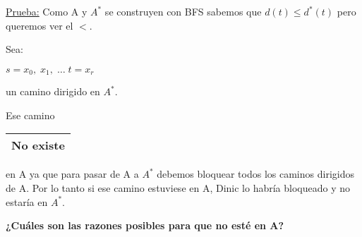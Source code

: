 \documentclass[12pt,a4paper]{report}
\begin{document}
		\underline{Prueba:} Como A y $A^{*}$ se construyen con BFS sabemos que $d(t) \leq d^{*}(t)$ pero queremos ver el $<$.

		Sea:
		\begin{center}
			$s = x_{0}, \; x_{1}, \; \dotsc \; t = x_{r}$
		\end{center}

		un camino dirigido en $A^{*}$.

		Ese camino \begin{tabular}{|c|} \hline No existe \\ \hline \end{tabular} en A ya que para pasar de A a $A^{*}$ debemos bloquear todos los caminos dirigidos de A. Por lo tanto si ese camino estuviese en A, Dinic lo habría bloqueado y no estaría en $A^{*}$.

		\textbf{¿Cuáles son las razones posibles para que no esté en A?}
\end{document}

